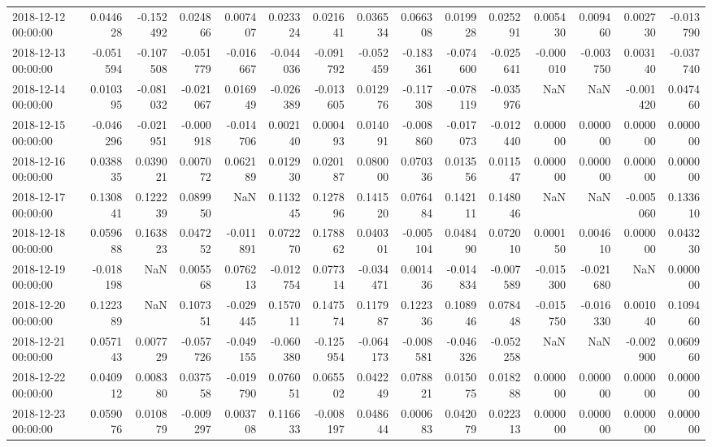 \begin{tabular}{lrrrrrrrrrrrrrr}
2018-12-12 00:00:00 & 0.044628 & -0.152492 & 0.024866 & 0.007407 & 0.023324 & 0.021641 & 0.036534 & 0.066308 & 0.019928 & 0.025291 & 0.005430 & 0.009460 & 0.002730 & -0.013790 \\
2018-12-13 00:00:00 & -0.051594 & -0.107508 & -0.051779 & -0.016667 & -0.044036 & -0.091792 & -0.052459 & -0.183361 & -0.074600 & -0.025641 & -0.000010 & -0.003750 & 0.003140 & -0.037740 \\
2018-12-14 00:00:00 & 0.010395 & -0.081032 & -0.021067 & 0.016949 & -0.026389 & -0.013605 & 0.012976 & -0.117308 & -0.078119 & -0.035976 & NaN & NaN & -0.001420 & 0.047460 \\
2018-12-15 00:00:00 & -0.046296 & -0.021951 & -0.000918 & -0.014706 & 0.002140 & 0.000493 & 0.014091 & -0.008860 & -0.017073 & -0.012440 & 0.000000 & 0.000000 & 0.000000 & 0.000000 \\
2018-12-16 00:00:00 & 0.038835 & 0.039021 & 0.007072 & 0.062189 & 0.012930 & 0.020187 & 0.080000 & 0.070336 & 0.013556 & 0.011547 & 0.000000 & 0.000000 & 0.000000 & 0.000000 \\
2018-12-17 00:00:00 & 0.130841 & 0.122239 & 0.089950 & NaN & 0.113245 & 0.127896 & 0.141520 & 0.076484 & 0.142111 & 0.148046 & NaN & NaN & -0.005060 & 0.133610 \\
2018-12-18 00:00:00 & 0.059688 & 0.163823 & 0.047252 & -0.011891 & 0.072270 & 0.178862 & 0.040301 & -0.005104 & 0.048490 & 0.072010 & 0.000150 & 0.004610 & 0.000000 & 0.043230 \\
2018-12-19 00:00:00 & -0.018198 & NaN & 0.005568 & 0.076213 & -0.012754 & 0.077314 & -0.034471 & 0.001436 & -0.014834 & -0.007589 & -0.015300 & -0.021680 & NaN & 0.000000 \\
2018-12-20 00:00:00 & 0.122389 & NaN & 0.107351 & -0.029445 & 0.157011 & 0.147574 & 0.117987 & 0.122336 & 0.108946 & 0.078448 & -0.015750 & -0.016330 & 0.001040 & 0.109460 \\
2018-12-21 00:00:00 & 0.057143 & 0.007729 & -0.057726 & -0.049155 & -0.060380 & -0.125954 & -0.064173 & -0.008581 & -0.046326 & -0.052258 & NaN & NaN & -0.002900 & 0.060960 \\
2018-12-22 00:00:00 & 0.040912 & 0.008380 & 0.037558 & -0.019790 & 0.076051 & 0.065502 & 0.042249 & 0.078821 & 0.015075 & 0.018288 & 0.000000 & 0.000000 & 0.000000 & 0.000000 \\
2018-12-23 00:00:00 & 0.059076 & 0.010879 & -0.009297 & 0.003708 & 0.116633 & -0.008197 & 0.048644 & 0.000683 & 0.042079 & 0.022313 & 0.000000 & 0.000000 & 0.000000 & 0.000000 \\

\end{tabular}
